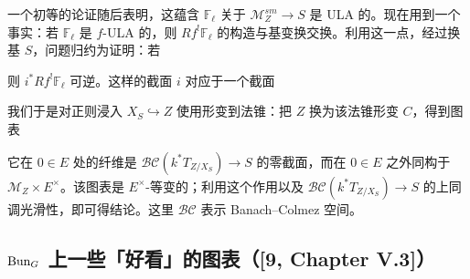 一个初等的论证随后表明，这蕴含 $\mathbb F_\ell$ 关于 $\mathcal M_Z^{sm}\to S$ 是 ULA 的。现在用到一个事实：若 $\mathbb F_\ell$ 是 $f$-ULA 的，则 $Rf^!\mathbb F_\ell$ 的构造与基变换交换。利用这一点，经过换基 $S$，问题归约为证明：若
\begin{center}
\end{center}
则 $i^*Rf^!\mathbb F_\ell$ 可逆。这样的截面 $i$ 对应于一个截面
\begin{center}
\end{center}
我们于是对正则浸入 $X_S\hookrightarrow Z$ 使用形变到法锥：把 $Z$ 换为该法锥形变 $C$，得到图表
\begin{center}
\end{center}
它在 $0\in E$ 处的纤维是 $\mathcal{BC}(k^*T_{Z/X_S})\to S$ 的零截面，而在 $0\in E$ 之外同构于 $\mathcal M_Z\times E^\times$。该图表是 $E^\times$-等变的；利用这个作用以及 $\mathcal{BC}(k^*T_{Z/X_S})\to S$ 的上同调光滑性，即可得结论。这里 $\mathcal{BC}$ 表示 Banach--Colmez 空间。

\subsection{$\operatorname{Bun}_G$ 上一些「好看」的图表（[9, Chapter V.3]）}\label{sec:a3-2-8}


